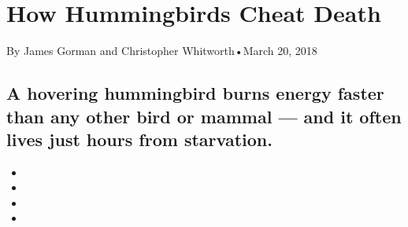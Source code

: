\hypertarget{how-hummingbirds-cheat-death-1}{%
\section{How Hummingbirds Cheat
Death}\label{how-hummingbirds-cheat-death-1}}

By James Gorman and Christopher Whitworth•March 20, 2018

\hypertarget{a-hovering-hummingbird-burns-energy-faster-than-any-other-bird-or-mammal--and-it-often-lives-just-hours-from-starvation-1}{%
\subsection{A hovering hummingbird burns energy faster than any other
bird or mammal --- and it often lives just hours from
starvation.}\label{a-hovering-hummingbird-burns-energy-faster-than-any-other-bird-or-mammal--and-it-often-lives-just-hours-from-starvation-1}}

\begin{itemize}
\item
\item
\item
\item
\end{itemize}


